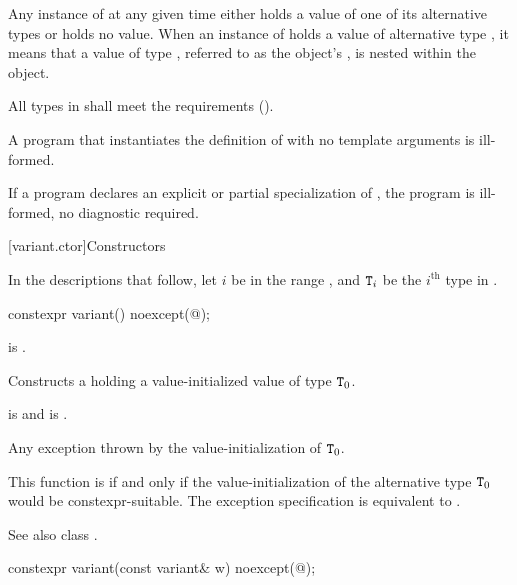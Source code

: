 \pnum
Any instance of  at any given time either holds a value
of one of its alternative types or holds no value.
When an instance of  holds a value of alternative type ,
it means that a value of type , referred to as the 
object's ,
is nested within the
 object.

\pnum
All types in  shall meet
the  requirements ().

\pnum
A program that instantiates the definition of  with
no template arguments is ill-formed.

\pnum
If a program declares an explicit or partial specialization of ,
the program is ill-formed, no diagnostic required.

[variant.ctor]{Constructors}

\pnum
In the descriptions that follow, let $i$ be in the range ,
and $\tcode{T}_i$ be the $i^\text{th}$ type in .

%
\begin{itemdecl}
constexpr variant() noexcept(@\seebelow@);
\end{itemdecl}

\begin{itemdescr}
\pnum
\constraints
{} is .

\pnum
\effects
Constructs a  holding a value-initialized value of type $\tcode{T}_0$.

\pnum
\ensures
{} is  and  is .

\pnum
\throws
Any exception thrown by the value-initialization of $\tcode{T}_0$.

\pnum
\remarks
This function is  if and only if the
value-initialization of the alternative type $\tcode{T}_0$
would be constexpr-suitable.
The exception specification is equivalent to
.
\begin{note}
See also class .
\end{note}
\end{itemdescr}

%
\begin{itemdecl}
constexpr variant(const variant& w) noexcept(@\seebelow@);
\end{itemdecl}

